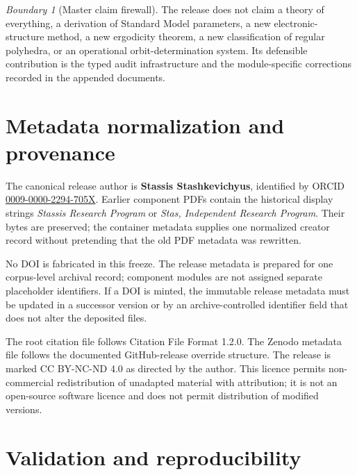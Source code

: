 \documentclass[11pt,a4paper]{article}
\theoremstyle{definition}
\theoremstyle{plain}
\theoremstyle{remark}
\newtheorem{boundary}[definition]{Boundary}
\begin{document}
\begin{boundary}[Master claim firewall]
The release does not claim a theory of everything, a derivation of
Standard Model parameters, a new electronic-structure method, a new
ergodicity theorem, a new classification of regular polyhedra, or an
operational orbit-determination system.  Its defensible contribution
is the typed audit infrastructure and the module-specific corrections
recorded in the appended documents.
\end{boundary}

\section{Metadata normalization and provenance}

The canonical release author is \textbf{Stassis Stashkevichyus},
identified by ORCID
\href{https://orcid.org/0009-0000-2294-705X}
{0009-0000-2294-705X}.  Earlier component PDFs contain the historical
display strings \emph{Stassis Research Program} or
\emph{Stas, Independent Research Program}.  Their bytes are preserved;
the container metadata supplies one normalized creator record without
pretending that the old PDF metadata was rewritten.

No DOI is fabricated in this freeze.  The release metadata is prepared
for one corpus-level archival record; component modules are not assigned
separate placeholder identifiers.  If a DOI is minted, the immutable
release metadata must be updated in a successor version or by an
archive-controlled identifier field that does not alter the deposited
files.

The root citation file follows Citation File Format 1.2.0.  The Zenodo
metadata file follows the documented GitHub-release override structure.
The release is marked CC BY-NC-ND 4.0 as directed by the author.  This
licence permits non-commercial redistribution of unadapted material
with attribution; it is not an open-source software licence and does
not permit distribution of modified versions.

\section{Validation and reproducibility}
\end{document}
